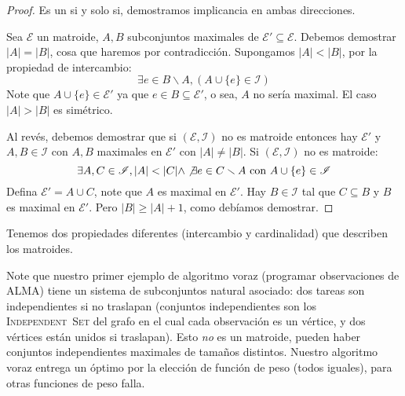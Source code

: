   \begin{proof}
    Es un si y solo si,
    demostramos implicancia en ambas direcciones.

    Sea \(\mathscr{E}\) un matroide,
    \(A, B\) subconjuntos maximales de \(\mathscr{E}' \subseteq \mathscr{E}\).
    Debemos demostrar \(\lvert A \rvert = \lvert B \rvert\),
    cosa que haremos por contradicción.
    Supongamos \(\lvert A \rvert < \lvert B \rvert\),
    por la propiedad de intercambio:
    \begin{equation*}
      \exists e \in B \smallsetminus A,
        (A \cup \{ e \} \in \mathscr{I})
    \end{equation*}
    Note que \(A \cup \{ e \} \in \mathscr{E}'\)
    ya que \(e \in B \subseteq \mathscr{E}'\),
    o sea,
    \(A\) no sería maximal.
    El caso \(\lvert A \rvert > \lvert B \rvert\) es simétrico.

    Al revés,
    debemos demostrar que
    si \((\mathscr{E}, \mathscr{I})\) no es matroide
    entonces hay \(\mathscr{E}'\) y \(A, B \in \mathscr{I}\)
    con \(A, B\) maximales en \(\mathscr{E}'\)
    con \(\lvert A \rvert \ne \lvert B \rvert\).
    Si \((\mathscr{E}, \mathscr{I})\) no es matroide:
    \begin{equation*}
      \exists A, C \in \mathscr{I},
        \lvert A \rvert < \lvert C \rvert \wedge
          \not\exists e \in C \smallsetminus A
          \text{\ con\ } A \cup \{ e \} \in \mathscr{I}
    \end{equation*}
    Defina \(\mathscr{E}' = A \cup C\),
    note que \(A\) es maximal en \(\mathscr{E}'\).
    Hay \(B \in \mathscr{I}\) tal que \(C \subseteq B\)
    y \(B\) es maximal en \(\mathscr{E}'\).
    Pero \(\lvert B \rvert \ge \lvert A \rvert + 1\),
    como debíamos demostrar.
  \end{proof}
  Tenemos dos propiedades diferentes
  (intercambio y cardinalidad)
  que describen los matroides.

  Note que nuestro primer ejemplo de algoritmo voraz
  (programar observaciones de ALMA)
  tiene un sistema de subconjuntos natural asociado:
  dos tareas son independientes si no traslapan
  (conjuntos independientes son los \textsc{Independent~Set}
   del grafo en el cual cada observación es un vértice,
   y dos vértices están unidos si traslapan).
  Esto \emph{no} es un matroide,
  pueden haber conjuntos independientes maximales de tamaños distintos.
  Nuestro algoritmo voraz entrega un óptimo por la elección
  de función de peso
  (todos iguales),
  para otras funciones de peso falla.

